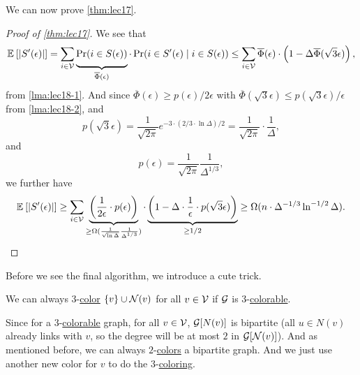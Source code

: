 We can now prove \autoref{thm:lec17}.

\begin{proof}[Proof of \autoref{thm:lec17}]
	We see that
	\[
		\mathbb{E}_{}\left[\left\vert S^\prime (\epsilon ) \right\vert  \right]
		= \sum_{i\in \mathcal{\MakeUppercase{v}} } \underbrace{\Pr_{}(i\in S(\epsilon ))}_{\overline{\Phi }(\epsilon )}\cdot \Pr_{}(i\in S^\prime (\epsilon )\mid i\in S(\epsilon ))
		\leq  \sum_{i\in \mathcal{\MakeUppercase{v}} } \overline{\Phi }(\epsilon )\cdot \left( 1 - \Delta \overline{\Phi }(\sqrt{3}\epsilon  ) \right),
	\]
	from \autoref{lma:lec18-1}. And since \(\overline{\Phi }(\epsilon )\geq p(\epsilon ) / 2\epsilon \) with \(\overline{\Phi }(\sqrt{3}\epsilon) \leq p(\sqrt{3}\epsilon) / \epsilon\) from \autoref{lma:lec18-2}, and
	\[
		p(\sqrt{3} \epsilon ) = \frac{1}{\sqrt{2\pi } } e^{- 3\cdot (2 / 3 \cdot \ln \Delta ) / 2} = \frac{1}{\sqrt{2\pi } }\cdot \frac{1}{\Delta },
	\]
	and
	\[
		p(\epsilon ) = \frac{1}{\sqrt{2\pi } }\frac{1}{\Delta ^{1 / 3}},
	\]
	we further have
	\[
		\mathbb{E}_{}\left[\left\vert S^\prime (\epsilon ) \right\vert  \right]
		\geq \sum_{i\in \mathcal{\MakeUppercase{v}} } \underbrace{\left( \frac{1}{2\epsilon }\cdot p(\epsilon ) \right)}_{\geq \Omega (\frac{1}{\sqrt{\ln \Delta } } \frac{1}{\Delta ^{1 / 3}})} \cdot \underbrace{\left( 1 - \Delta \cdot \frac{1}{\epsilon }\cdot p(\sqrt{3} \epsilon ) \right)}_{\geq 1 / 2}
		\geq \Omega (n\cdot \Delta ^{-1 / 3} \ln ^{-1 / 2}\Delta ).
	\]
\end{proof}

Before we see the final algorithm, we introduce a cute trick.

\begin{remark}\label{rmk:Wigderson-trick}
	We can always \(3\)-\hyperref[def:coloring]{color} \(\left\{ v \right\} \cup \mathcal{\MakeUppercase{n}} (v)\) for all \(v\in \mathcal{\MakeUppercase{v}} \) if \(\mathcal{\MakeUppercase{g}} \) is \(3\)-\hyperref[def:coloring]{colorable}.
\end{remark}
\begin{explanation}
	Since for a \(3\)-\hyperref[def:coloring]{colorable} graph, for all \(v\in \mathcal{\MakeUppercase{v}} \), \(\mathcal{\MakeUppercase{g}} [N(v)]\) is bipartite (all \(u\in N(v)\) already links with \(v\), so the degree will be at most \(2\) in \(\mathcal{\MakeUppercase{g}} [\mathcal{\MakeUppercase{n}} (v)]\)). And as mentioned before, we can always \(2\)-\hyperref[def:coloring]{colors} a bipartite graph. And we just use another new color for \(v\) to do the \(3\)-\hyperref[def:coloring]{coloring}.
\end{explanation}

